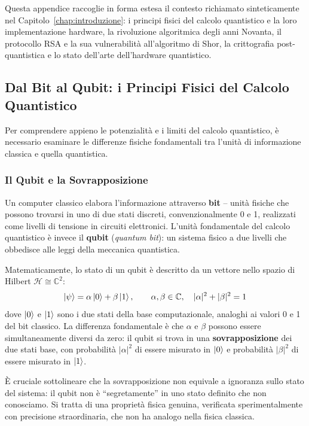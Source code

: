 \begin{onehalfspace}

Questa appendice raccoglie in forma estesa il contesto richiamato sinteticamente nel Capitolo~\ref{chap:introduzione}: i principi fisici del calcolo quantistico e la loro implementazione hardware, la rivoluzione algoritmica degli anni Novanta, il protocollo RSA e la sua vulnerabilità all'algoritmo di Shor, la crittografia post-quantistica e lo stato dell'arte dell'hardware quantistico.

\subsection{Dal Bit al Qubit: i Principi Fisici del Calcolo Quantistico}
\label{app:intro:qubit}

Per comprendere appieno le potenzialità e i limiti del calcolo quantistico, è necessario esaminare le differenze fisiche fondamentali tra l'unità di informazione classica e quella quantistica.

\subsubsection{Il Qubit e la Sovrapposizione}

Un computer classico elabora l'informazione attraverso \textbf{bit} -- unità fisiche che possono trovarsi in uno di due stati discreti, convenzionalmente 0 e 1, realizzati come livelli di tensione in circuiti elettronici. L'unità fondamentale del calcolo quantistico è invece il \textbf{qubit} (\textit{quantum bit}): un sistema fisico a due livelli che obbedisce alle leggi della meccanica quantistica.

Matematicamente, lo stato di un qubit è descritto da un vettore nello spazio di Hilbert $\mathcal{H} \cong \mathbb{C}^2$:
\begin{equation}
    \ket{\psi} = \alpha\ket{0} + \beta\ket{1}, \qquad \alpha,\beta \in \mathbb{C}, \quad |\alpha|^2 + |\beta|^2 = 1
    \label{eq:qubit_state}
\end{equation}
dove $\ket{0}$ e $\ket{1}$ sono i due stati della base computazionale, analoghi ai valori 0 e 1 del bit classico. La differenza fondamentale è che $\alpha$ e $\beta$ possono essere simultaneamente diversi da zero: il qubit si trova in una \textbf{sovrapposizione} dei due stati base, con probabilità $|\alpha|^2$ di essere misurato in $\ket{0}$ e probabilità $|\beta|^2$ di essere misurato in $\ket{1}$.

È cruciale sottolineare che la sovrapposizione non equivale a ignoranza sullo stato del sistema: il qubit non è ``segretamente'' in uno stato definito che non conosciamo. Si tratta di una proprietà fisica genuina, verificata sperimentalmente con precisione straordinaria, che non ha analogo nella fisica classica.


\end{onehalfspace}
